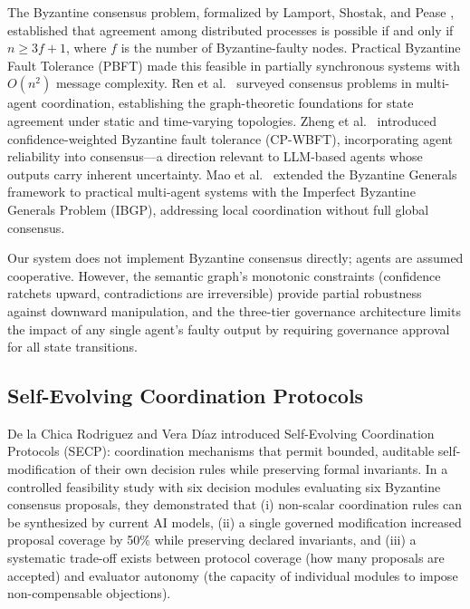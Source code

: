 \documentclass[11pt]{article}
\begin{document}
The Byzantine consensus problem, formalized by Lamport, Shostak, and Pease \cite{lamport1982}, established that agreement among distributed processes is possible if and only if $n \geq 3f + 1$, where $f$ is the number of Byzantine-faulty nodes. Practical Byzantine Fault Tolerance (PBFT) \cite{castro1999} made this feasible in partially synchronous systems with $O(n^2)$ message complexity. Ren et al.\ \cite{ren2005} surveyed consensus problems in multi-agent coordination, establishing the graph-theoretic foundations for state agreement under static and time-varying topologies. Zheng et al.\ \cite{zheng2025} introduced confidence-weighted Byzantine fault tolerance (CP-WBFT), incorporating agent reliability into consensus---a direction relevant to LLM-based agents whose outputs carry inherent uncertainty. Mao et al.\ \cite{mao2024} extended the Byzantine Generals framework to practical multi-agent systems with the Imperfect Byzantine Generals Problem (IBGP), addressing local coordination without full global consensus.

Our system does not implement Byzantine consensus directly; agents are assumed cooperative. However, the semantic graph's monotonic constraints (confidence ratchets upward, contradictions are irreversible) provide partial robustness against downward manipulation, and the three-tier governance architecture limits the impact of any single agent's faulty output by requiring governance approval for all state transitions.

\subsection{Self-Evolving Coordination Protocols}

De la Chica Rodriguez and Vera D\'{i}az \cite{delachica2026} introduced Self-Evolving Coordination Protocols (SECP): coordination mechanisms that permit bounded, auditable self-modification of their own decision rules while preserving formal invariants. In a controlled feasibility study with six decision modules evaluating six Byzantine consensus proposals, they demonstrated that (i) non-scalar coordination rules can be synthesized by current AI models, (ii) a single governed modification increased proposal coverage by 50\% while preserving declared invariants, and (iii) a systematic trade-off exists between protocol coverage (how many proposals are accepted) and evaluator autonomy (the capacity of individual modules to impose non-compensable objections).
\end{document}

